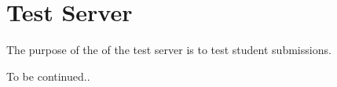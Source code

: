 
\section{Test Server}

The purpose of the of the test server is to test student submissions.

To be continued..
